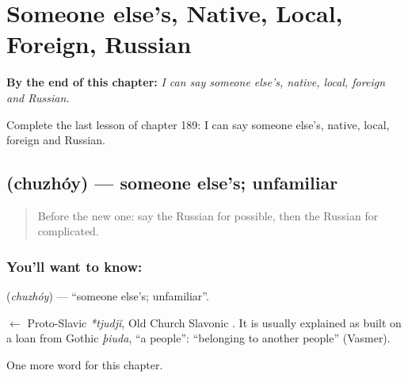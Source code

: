 
\chapter{Someone else's, Native, Local, Foreign, Russian}
\label{ch:ru-someone-else-s-native-local-foreign-russian}

\begin{chapteropening}
\textbf{By the end of this chapter:} \emph{I can say someone else's, native, local, foreign and Russian.}

Complete the last lesson of chapter 189: I can say someone else's, native, local, foreign and Russian.
\end{chapteropening}

\section[\texorpdfstring{\ru{чужой} (chuzhóy)}{чужой (chuzhóy)}]{ (chuzhóy) — someone else's; unfamiliar}

\label{lesson:RU-C189-chuzhoy}



\begin{quote}
Before the new one: say the Russian for possible, then the Russian for complicated.
\end{quote}

\subsection*{You'll want to know: }
\textbf{} (\emph{chuzhóy}) — \textquotedblleft{}someone else's; unfamiliar\textquotedblright{}.

\begin{cousinweb}
\textbf{} $\leftarrow$ Proto-Slavic \emph{*tjudjĭ}, Old Church Slavonic \emph{}. It is usually explained as built on a loan from Gothic \emph{þiuda}, \textquotedblleft{}a people\textquotedblright{}: \textquotedblleft{}belonging to another people\textquotedblright{} (Vasmer).
\end{cousinweb}

\begin{grammarlens}[title={What you've built}]
One more word for this chapter.
\end{grammarlens}


